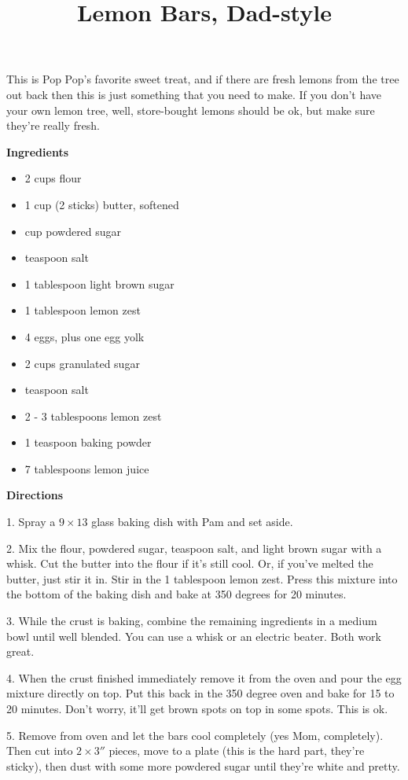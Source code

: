 \documentclass{article}
\title{Lemon Bars, Dad-style}
\begin{document}
This is Pop Pop's favorite sweet treat, and if there are fresh lemons from the tree out
back then this is just something that you need to make. If you don't have your own
lemon tree, well, store-bought lemons should be ok, but make sure they're really fresh.

\bigskip

\bigskip

\textbf{Ingredients}

\begin{itemize}
    \item 2 cups flour
    \item 1 cup (2 sticks) butter, softened
    \item {} cup powdered sugar
    \item {} teaspoon salt
    \item 1 tablespoon light brown sugar
    \item 1 tablespoon lemon zest

    \item 4 eggs, plus one egg yolk
    \item 2 cups granulated sugar
    \item {} teaspoon salt
    \item 2 - 3 tablespoons lemon zest
    \item 1 teaspoon baking powder
    \item 7 tablespoons lemon juice
\end{itemize}

\bigskip

\textbf{Directions}

1. Spray a $9\times13$ glass baking dish with Pam and set aside.

2. Mix the flour, powdered sugar,  teaspoon salt, and light brown sugar
with a whisk. Cut the butter into the flour if it's still cool. Or, if you've melted
the butter, just stir it in. Stir in the 1 tablespoon lemon zest. Press this mixture
into the bottom of the baking dish and bake at 350 degrees for 20 minutes.

3. While the crust is baking, combine the remaining ingredients in a medium bowl until
well blended. You can use a whisk or an electric beater. Both work great.

4. When the crust finished immediately remove it from the oven and pour the egg mixture
directly on top. Put this back in the 350 degree oven and bake for 15 to 20 minutes. Don't
worry, it'll get brown spots on top in some spots. This is ok.

5. Remove from oven and let the bars cool completely (yes Mom, completely). Then cut into
$2\times3''$ pieces, move to a plate (this is the hard part, they're sticky), then dust
with some more powdered sugar until they're white and pretty.

\end{document}
